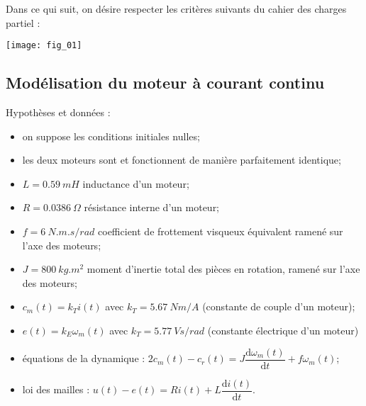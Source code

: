 Dans ce qui suit, on désire respecter les critères suivants du cahier des charges partiel :
\begin{center}
	\texttt{[image: fig\_01]}
\end{center}



\subsection*{Modélisation du moteur à courant continu}

Hypothèses et données :
\begin{itemize}
\item on suppose les conditions initiales nulles;
\item les deux moteurs sont et fonctionnent de manière parfaitement identique;
\item $L=\SI{0,59}{mH}$ inductance d’un moteur;
\item $R=\SI{0,0386}{\Omega}$ résistance interne d’un moteur;
\item $f=\SI{6}{N.m.s/rad}$ coefficient de frottement visqueux équivalent ramené sur l’axe des moteurs;
\item $J=\SI{800}{kg.m^2}$ moment d’inertie total des pièces en rotation, ramené sur l’axe des moteurs; 
\item $c_m(t)=k_Ti(t)$ avec $k_T=\SI{5.67}{Nm/A}$ (constante de couple d’un moteur);
\item $e(t)=k_E\omega_m(t)$ avec $k_T=\SI{5.77}{Vs/rad}$   (constante électrique d’un moteur)
\item équations de la dynamique : $2c_m(t)-c_r(t)=J\dfrac{\text{d}\omega_m(t)}{{\text{d}}t}+f\omega_m(t)$;
\item loi des mailles : $u(t)-e(t)=Ri(t)+L\dfrac{\text{d}i(t)}{\text{d}t}$.

\end{itemize}

